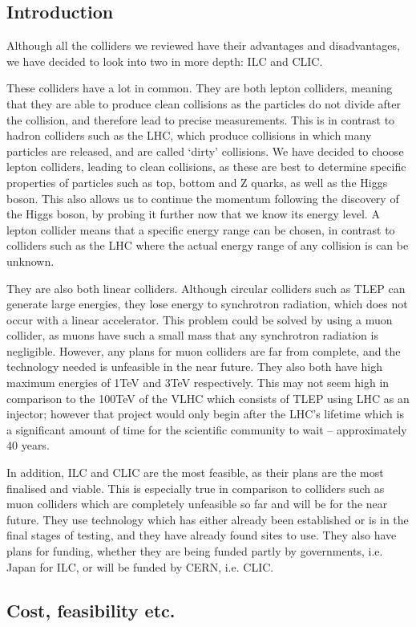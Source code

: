 \subsection{Introduction}
Although all the colliders we reviewed have their advantages and disadvantages, we have decided to look into two in more depth: ILC and CLIC. 

These colliders have a lot in common. They are both lepton colliders, meaning that they are able to produce clean collisions as the particles do not divide after the collision, and therefore lead to precise measurements. This is in contrast to hadron colliders such as the LHC, which produce collisions in which many particles are released, and are called ‘dirty’ collisions. We have decided to choose lepton colliders, leading to clean collisions, as these are best to determine specific properties of particles such as top, bottom and Z quarks, as well as the Higgs boson. This also allows us to continue the momentum following the discovery of the Higgs boson, by probing it further now that we know its energy level. A lepton collider means that a specific energy range can be chosen, in contrast to colliders such as the LHC where the actual energy range of any collision is can be unknown.

They are also both linear colliders. Although circular colliders such as TLEP can generate large energies, they lose energy to synchrotron radiation, which does not occur with a linear accelerator. This problem could be solved by using a muon collider, as muons have such a small mass that any synchrotron radiation is negligible. However, any plans for muon colliders are far from complete, and the technology needed is unfeasible in the near future. They also both have high maximum energies of 1TeV and 3TeV respectively. This may not seem high in comparison to the 100TeV of the VLHC which consists of TLEP using LHC as an injector; however that project would only begin after the LHC’s lifetime which is a significant amount of time for the scientific community to wait – approximately 40 years.

In addition, ILC and CLIC are the most feasible, as their plans are the most finalised and viable. This is especially true in comparison to colliders such as muon colliders which are completely unfeasible so far and will be for the near future. They use technology which has either already been established or is in the final stages of testing, and they have already found sites to use. They also have plans for funding, whether they are being funded partly by governments, i.e. Japan for ILC, or will be funded by CERN, i.e. CLIC.

\subsection{Cost, feasibility etc.}